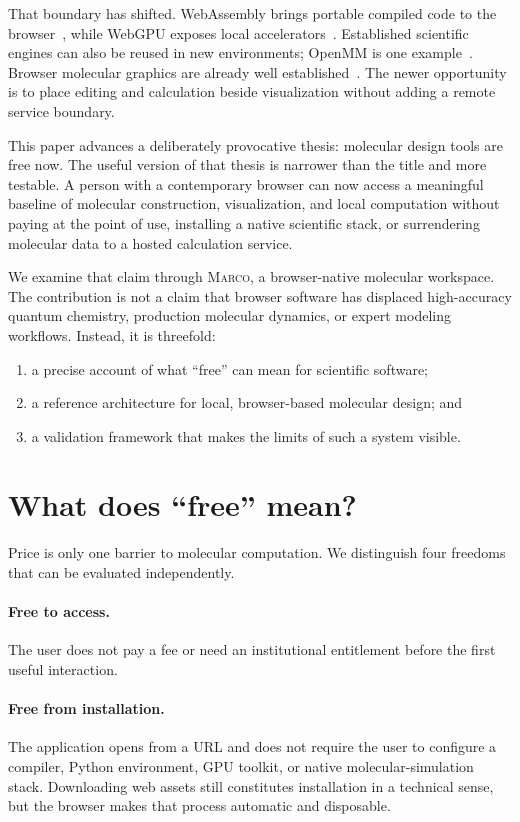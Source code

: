 \documentclass[11pt]{article}
\newcommand{\marco}{\textsc{Marco}}
\begin{document}
That boundary has shifted.
WebAssembly brings portable compiled code to the browser~\cite{haas2017webassembly},
while WebGPU exposes local accelerators~\cite{w3c2025webgpu}.
Established scientific engines can also be reused in new environments; OpenMM is
one example~\cite{eastman2017openmm}.
Browser molecular graphics are already well established~\cite{rose2015ngl}.
The newer opportunity is to place editing and calculation beside visualization
without adding a remote service boundary.

This paper advances a deliberately provocative thesis: molecular design tools
are free now.
The useful version of that thesis is narrower than the title and more testable.
A person with a contemporary browser can now access a meaningful baseline of
molecular construction, visualization, and local computation without paying at
the point of use, installing a native scientific stack, or surrendering molecular
data to a hosted calculation service.

We examine that claim through \marco, a browser-native molecular workspace.
The contribution is not a claim that browser software has displaced
high-accuracy quantum chemistry, production molecular dynamics, or expert
modeling workflows.
Instead, it is threefold:

\begin{enumerate}
  \item a precise account of what ``free'' can mean for scientific software;
  \item a reference architecture for local, browser-based molecular design; and
  \item a validation framework that makes the limits of such a system visible.
\end{enumerate}

\section{What does \enquote{free} mean?}
\label{sec:free}

Price is only one barrier to molecular computation.
We distinguish four freedoms that can be evaluated independently.

\paragraph{Free to access.}
The user does not pay a fee or need an institutional entitlement before the
first useful interaction.

\paragraph{Free from installation.}
The application opens from a URL and does not require the user to configure a
compiler, Python environment, GPU toolkit, or native molecular-simulation stack.
Downloading web assets still constitutes installation in a technical sense, but
the browser makes that process automatic and disposable.
\end{document}
